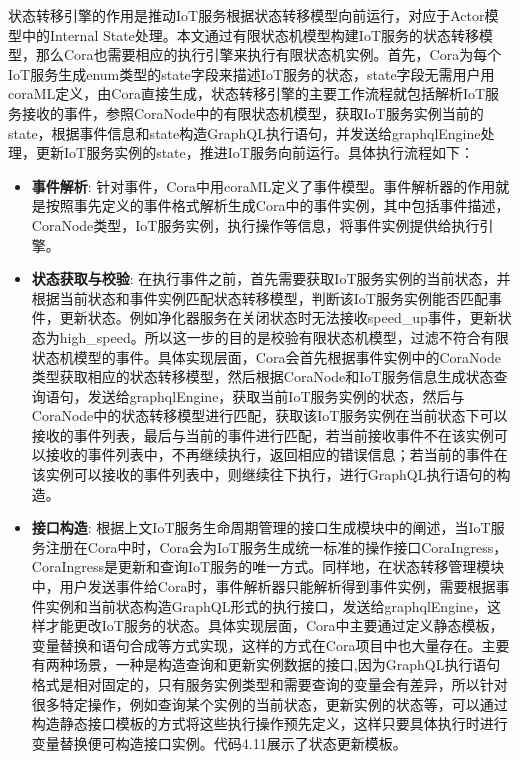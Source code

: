 \documentclass[winfonts,master,twoside]{njuthesis}
\begin{document}
状态转移引擎的作用是推动IoT服务根据状态转移模型向前运行，对应于Actor模型中的Internal State处理。本文通过有限状态机模型构建IoT服务的状态转移模型，那么Cora也需要相应的执行引擎来执行有限状态机实例。首先，Cora为每个IoT服务生成enum类型的state字段来描述IoT服务的状态，state字段无需用户用coraML定义，由Cora直接生成，状态转移引擎的主要工作流程就包括解析IoT服务接收的事件，参照CoraNode中的有限状态机模型，获取IoT服务实例当前的state，根据事件信息和state构造GraphQL执行语句，并发送给graphqlEngine处理，更新IoT服务实例的state，推进IoT服务向前运行。具体执行流程如下：
\begin{itemize}
    \item \textbf{事件解析}:
    针对事件，Cora中用coraML定义了事件模型。事件解析器的作用就是按照事先定义的事件格式解析生成Cora中的事件实例，其中包括事件描述，CoraNode类型，IoT服务实例，执行操作等信息，将事件实例提供给执行引擎。
    \item \textbf{状态获取与校验}:
    在执行事件之前，首先需要获取IoT服务实例的当前状态，并根据当前状态和事件实例匹配状态转移模型，判断该IoT服务实例能否匹配事件，更新状态。例如净化器服务在关闭状态时无法接收speed\_up事件，更新状态为high\_speed。所以这一步的目的是校验有限状态机模型，过滤不符合有限状态机模型的事件。具体实现层面，Cora会首先根据事件实例中的CoraNode类型获取相应的状态转移模型，然后根据CoraNode和IoT服务信息生成状态查询语句，发送给graphqlEngine，获取当前IoT服务实例的状态，然后与CoraNode中的状态转移模型进行匹配，获取该IoT服务实例在当前状态下可以接收的事件列表，最后与当前的事件进行匹配，若当前接收事件不在该实例可以接收的事件列表中，不再继续执行，返回相应的错误信息；若当前的事件在该实例可以接收的事件列表中，则继续往下执行，进行GraphQL执行语句的构造。
    \item \textbf{接口构造}:
    根据上文IoT服务生命周期管理的接口生成模块中的阐述，当IoT服务注册在Cora中时，Cora会为IoT服务生成统一标准的操作接口CoraIngress，CoraIngress是更新和查询IoT服务的唯一方式。同样地，在状态转移管理模块中，用户发送事件给Cora时，事件解析器只能解析得到事件实例，需要根据事件实例和当前状态构造GraphQL形式的执行接口，发送给graphqlEngine，这样才能更改IoT服务的状态。具体实现层面，Cora中主要通过定义静态模板，变量替换和语句合成等方式实现，这样的方式在Cora项目中也大量存在。主要有两种场景，一种是构造查询和更新实例数据的接口,因为GraphQL执行语句格式是相对固定的，只有服务实例类型和需要查询的变量会有差异，所以针对很多特定操作，例如查询某个实例的当前状态，更新实例的状态等，可以通过构造静态接口模板的方式将这些执行操作预先定义，这样只要具体执行时进行变量替换便可构造接口实例。代码4.11展示了状态更新模板。
    \begin{lstlisting}[caption={状态更新模板},language=json,basicstyle=\footnotesize]

\end{lstlisting}
\end{itemize}
\end{document}
